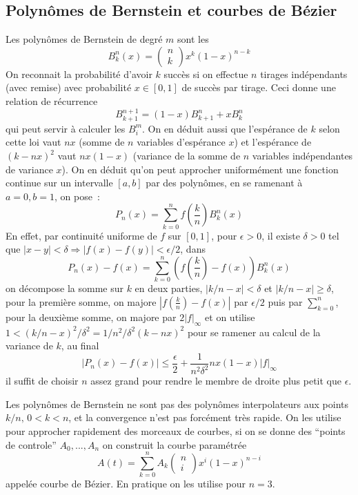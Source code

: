 \documentclass[a4paper,11pt]{book}
\begin{document}
\begin{giacjshere}
\section{Polyn\^omes de Bernstein et courbes de
  B\'ezier} 
Les polyn\^omes de Bernstein de degr\'e $m$ sont les
$$ B^n_k (x) = 
\left( \begin{array}{c} n \\ k \end{array} \right) x^k (1-x)^{n-k}$$
On reconnait la probabilit\'e d'avoir $k$ succ\`es si on effectue $n$
tirages ind\'ependants (avec remise) 
avec probabilit\'e $x \in [0,1]$ de succ\`es par tirage. Ceci donne
une relation de r\'ecurrence
$$ B^{n+1}_{k+1}=(1-x)B^n_{k+1}+x B^n_k $$
qui peut servir \`a calculer les $B^m_i$. On en d\'eduit aussi que l'esp\'erance
de $k$ selon cette loi vaut $nx$ (somme de $n$ variables d'esp\'erance
$x$) et l'esp\'erance de $(k-nx)^2$ vaut
$nx(1-x)$ (variance de la somme de $n$ variables ind\'ependantes
de variance $x$).
On en d\'eduit qu'on peut approcher uniform\'ement une
fonction continue sur un intervalle $[a,b]$ par des polyn\^omes, en
se ramenant \`a $a=0, b=1$, on pose~:
$$ P_n(x) = \sum_{k=0}^n f(\frac{k}{n}) B^n_k(x) $$
En effet, par continuit\'e uniforme de $f$ sur $[0,1]$, pour
$\epsilon>0$,
il existe $\delta>0$ tel que $|x-y|<\delta \Rightarrow
|f(x)-f(y)|<\epsilon/2$,
dans
$$P_n(x)-f(x)=\sum_{k=0}^n (f(\frac{k}{n})-f(x)) B^n_k(x)$$
on d\'ecompose la somme sur $k$ en deux parties, $|k/n-x|<\delta$
et $|k/n-x| \geq \delta$, pour la premi\`ere somme, on majore
$|f(\frac{k}{n})-f(x)|$ par $\epsilon/2$ puis par $\sum_{k=0}^n$,
pour la deuxi\`eme somme, on majore par $2|f|_\infty$ et on utilise
$1<(k/n-x)^2/\delta^2=1/n^2/\delta^2 (k-nx)^2$ pour se ramener au calcul
de la variance de $k$, au final
$$ |P_n(x)-f(x)| \leq \frac \epsilon 2 + \frac{1}{n^2 \delta^2} nx(1-x)|f|_\infty$$
il suffit de choisir $n$ assez grand pour rendre le membre de droite
plus petit que $\epsilon$.

Les polyn\^omes de Bernstein ne sont pas des polyn\^omes
interpolateurs aux points $k/n, \, 0<k<n$, et la convergence
n'est pas forc\'ement tr\`es rapide.
On les utilise pour approcher rapidement des morceaux de
courbes, si on se donne des ``points de controle'' $A_0, ..., A_n$
on construit la courbe param\'etr\'ee
$$ A(t) = \sum_{k=0}^n A_k \left( \begin{array}{c} n\\ i \end{array} \right) x^i
(1-x)^{n-i} $$
appel\'ee courbe de B\'ezier. En pratique on les utilise pour $n=3$.


\end{giacjshere}
\end{document}
